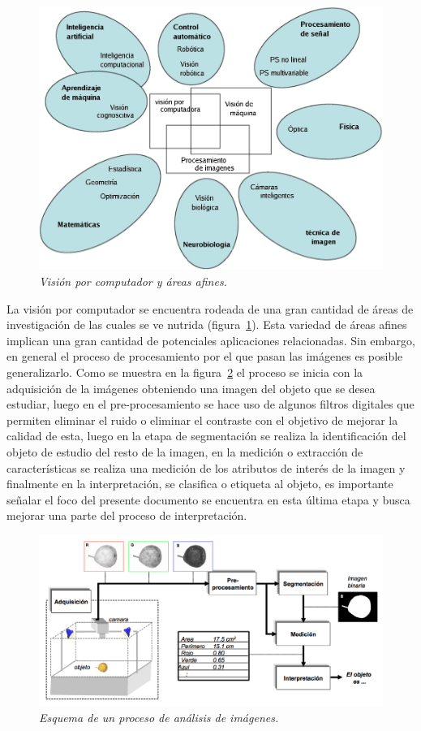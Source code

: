 \begin{figure}[tp]
  \centering
  \includegraphics[scale=.3]{images/cv-context}
  \caption{\em Visión por computador y áreas afines.}  
  \label{fig:cvcontext}
\end{figure}

La visión por computador se encuentra rodeada de una gran cantidad de áreas de investigación de las cuales se ve nutrida (figura~\ref{fig:cvcontext}). Esta variedad de áreas afines implican una gran cantidad de potenciales aplicaciones relacionadas. Sin embargo, en general el proceso de procesamiento por el que pasan las imágenes es posible generalizarlo. Como se muestra en la figura~\ref{fig:cvprocess} el proceso se inicia con la adquisición de la imágenes obteniendo una imagen del objeto que se desea estudiar, luego en el pre-procesamiento se hace uso de algunos filtros digitales que permiten eliminar el ruido o eliminar el contraste con el objetivo de mejorar la calidad de esta, luego en la etapa de segmentación se realiza la identificación del objeto de estudio del resto de la imagen, en la medición o extracción de características se realiza una medición de los atributos de interés de la imagen y finalmente en la interpretación, se clasifica o etiqueta al objeto, es importante señalar el foco del presente documento se encuentra en esta última etapa y busca mejorar una parte del proceso de interpretación.

\begin{figure}[tp]
  \centering
  \includegraphics[scale=.3]{images/cv-system}
  \caption{\em Esquema de un proceso de análisis de imágenes.} 
  \label{fig:cvprocess}
\end{figure}


